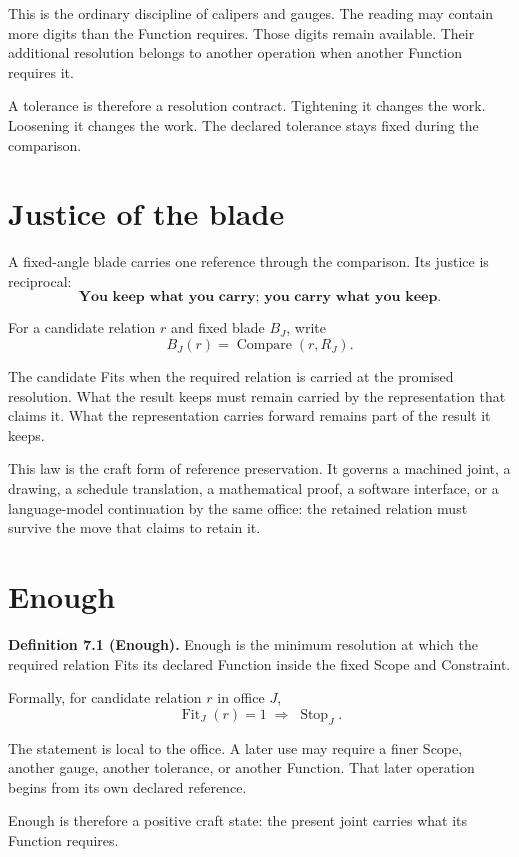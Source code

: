 \documentclass[10pt]{article}
\newcommand{\fit}{\operatorname{Fit}}
\newcommand{\stopop}{\operatorname{Stop}}
\begin{document}
This is the ordinary discipline of calipers and gauges. The reading may contain more digits than the Function requires. Those digits remain available. Their additional resolution belongs to another operation when another Function requires it.

A tolerance is therefore a resolution contract. Tightening it changes the work. Loosening it changes the work. The declared tolerance stays fixed during the comparison.

\section{Justice of the blade}

A fixed-angle blade carries one reference through the comparison. Its justice is reciprocal:
\[
\boxed{\textbf{You keep what you carry; you carry what you keep.}}
\]

For a candidate relation $r$ and fixed blade $B_J$, write
\[
B_J(r)=\operatorname{Compare}(r,R_J).
\]

The candidate Fits when the required relation is carried at the promised resolution. What the result keeps must remain carried by the representation that claims it. What the representation carries forward remains part of the result it keeps.

This law is the craft form of reference preservation. It governs a machined joint, a drawing, a schedule translation, a mathematical proof, a software interface, or a language-model continuation by the same office: the retained relation must survive the move that claims to retain it.

\section{Enough}

\textbf{Definition 7.1 (Enough).} Enough is the minimum resolution at which the required relation Fits its declared Function inside the fixed Scope and Constraint.

Formally, for candidate relation $r$ in office $J$,
\[
\boxed{\fit_J(r)=1\;\Longrightarrow\;\stopop_J.}
\]

The statement is local to the office. A later use may require a finer Scope, another gauge, another tolerance, or another Function. That later operation begins from its own declared reference.

Enough is therefore a positive craft state: the present joint carries what its Function requires.
\end{document}
